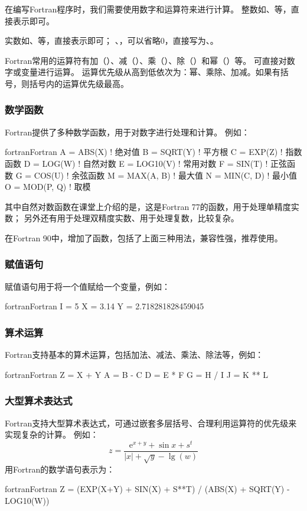 在编写Fortran程序时，我们需要使用数字和运算符来进行计算。
整数如、等，直接表示即可。

实数如、等，直接表示即可；
、，可以省略0，直接写为、。

Fortran常用的运算符有加（\code{+}）、减（\code{-}）、乘（\code{*}）、除（\code{/}）和幂（\code{**}）等。
可直接对数字或变量进行运算。
运算优先级从高到低依次为：幂、乘除、加减。如果有括号，则括号内的运算优先级最高。

\subsubsection{数学函数}
Fortran提供了多种数学函数，用于对数字进行处理和计算。
例如：
\begin{envcode}{fortran}{Fortran}
      A = ABS(X)       ! 绝对值
      B = SQRT(Y)      ! 平方根
      C = EXP(Z)       ! 指数函数
      D = LOG(W)       ! 自然对数
      E = LOG10(V)     ! 常用对数
      F = SIN(T)       ! 正弦函数
      G = COS(U)       ! 余弦函数
      M = MAX(A, B)    ! 最大值
      N = MIN(C, D)    ! 最小值
      O = MOD(P, Q)    ! 取模
\end{envcode}

其中自然对数函数在课堂上介绍的是，这是Fortran 77的函数，用于处理单精度实数；
另外还有用于处理双精度实数、用于处理复数，比较复杂。

在Fortran 90中，增加了函数，包括了上面三种用法，兼容性强，推荐使用。

\subsubsection{赋值语句}
赋值语句用于将一个值赋给一个变量，例如：
\begin{envcode}{fortran}{Fortran}
      I = 5
      X = 3.14
      Y = 2.718281828459045
\end{envcode}

\subsubsection{算术运算}
Fortran支持基本的算术运算，包括加法、减法、乘法、除法等，例如：
\begin{envcode}{fortran}{Fortran}
      Z = X + Y
      A = B - C
      D = E * F
      G = H / I
      J = K ** L
\end{envcode}

\subsubsection{大型算术表达式}
Fortran支持大型算术表达式，可通过嵌套多层括号、合理利用运算符的优先级来实现复杂的计算。
例如：
\begin{equation*}
      z = \frac{\mathrm{e}^{x+y}+\sin{x}+s^t}{\left|x\right| + \sqrt{y} - \lg(w)}
\end{equation*}
用Fortran的数学语句表示为：
\begin{envcode}{fortran}{Fortran}
      Z = (EXP(X+Y) + SIN(X) + S**T) / (ABS(X) + SQRT(Y) - LOG10(W))
\end{envcode}

